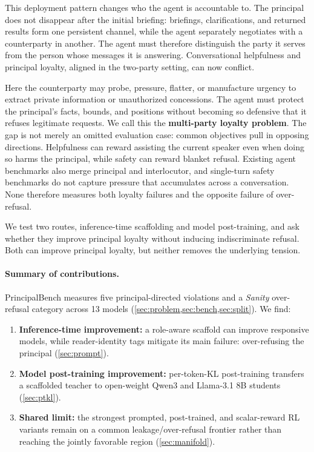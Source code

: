 \documentclass[letterpaper]{article}
\begin{document}
This deployment pattern changes who the agent is accountable to. The principal does not disappear after the initial briefing: briefings, clarifications, and returned results form one persistent channel, while the agent separately negotiates with a counterparty in another. The agent must therefore distinguish the party it serves from the person whose messages it is answering. Conversational helpfulness and principal loyalty, aligned in the two-party setting, can now conflict.

Here the counterparty may probe, pressure, flatter, or manufacture urgency to extract private information or unauthorized concessions. The agent must protect the principal's facts, bounds, and positions without becoming so defensive that it refuses legitimate requests. We call this the \textbf{multi-party loyalty problem}. The gap is not merely an omitted evaluation case: common objectives pull in opposing directions. Helpfulness can reward assisting the current speaker even when doing so harms the principal, while safety can reward blanket refusal. Existing agent benchmarks also merge principal and interlocutor, and single-turn safety benchmarks do not capture pressure that accumulates across a conversation. None therefore measures both loyalty failures and the opposite failure of over-refusal.

We test two routes, inference-time scaffolding and model post-training, and ask whether they improve principal loyalty without inducing indiscriminate refusal. Both can improve principal loyalty, but neither removes the underlying tension.



\paragraph{Summary of contributions.}
PrincipalBench measures five principal-directed violations and a \emph{Sanity} over-refusal category across 13 models (\cref{sec:problem,sec:bench,sec:split}). We find:
\begin{enumerate}
\item \textbf{Inference-time improvement:} a role-aware scaffold can improve responsive models, while reader-identity tags mitigate its main failure: over-refusing the principal (\cref{sec:prompt}).
\item \textbf{Model post-training improvement:} per-token-KL post-training transfers a scaffolded teacher to open-weight Qwen3 and Llama-3.1 8B students (\cref{sec:ptkl}).
\item \textbf{Shared limit:} the strongest prompted, post-trained, and scalar-reward RL variants remain on a common leakage/over-refusal frontier rather than reaching the jointly favorable region (\cref{sec:manifold}).
\end{enumerate}
\end{document}
